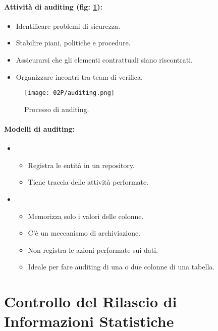 \paragraph{Attività di auditing (fig: \ref{fig:auditing}):}

\begin{itemize}
  \item Identificare problemi di sicurezza. 
  \item Stabilire piani, politiche e procedure. 
  \item Assicurarsi che gli elementi contrattuali siano riscontrati. 
  \item Organizzare incontri tra team di verifica. 
\end{itemize}

\begin{figure}[h]
    \centering
    \texttt{[image: 02P/auditing.png]}
    \caption{Processo di auditing.}
    \label{fig:auditing}

  \end{figure}

\paragraph{Modelli di auditing:}

\begin{itemize}
  \item {}
    \begin{itemize}
      \item Registra le entità in un repository. 
      \item Tiene traccia delle attività performate.
    \end{itemize}
  \item {}
    \begin{itemize}
      \item Memorizza solo i valori delle colonne. 
      \item C'è un meccanismo di archiviazione. 
      \item Non registra le azioni performate sui dati. 
      \item Ideale per fare auditing di una o due colonne di una tabella.
    \end{itemize}
\end{itemize}

\section{Controllo del Rilascio di Informazioni Statistiche}

